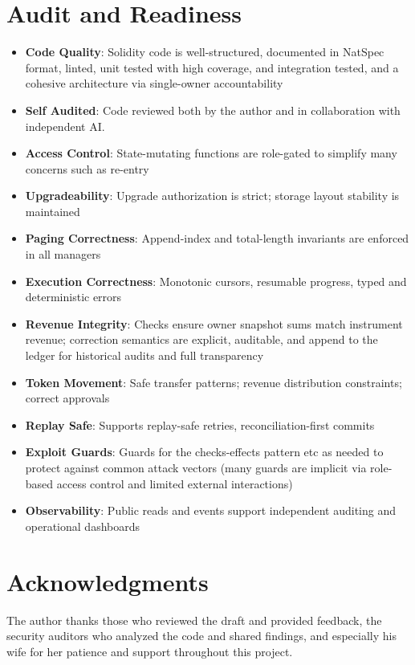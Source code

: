 \documentclass[10pt]{article}
\begin{document}
\section{Audit and Readiness}
\begin{itemize}
    \item \textbf{Code Quality}: Solidity code is well-structured, documented in NatSpec format, linted, unit tested with high coverage, and integration tested, and a cohesive architecture via single-owner accountability
    \item \textbf{Self Audited}: Code reviewed both by the author and in collaboration with independent AI.
    \item \textbf{Access Control}: State-mutating functions are role-gated to simplify many concerns such as re-entry
    \item \textbf{Upgradeability}: Upgrade authorization is strict; storage layout stability is maintained
    \item \textbf{Paging Correctness}: Append-index and total-length invariants are enforced in all managers
    \item \textbf{Execution Correctness}: Monotonic cursors, resumable progress, typed and deterministic errors
    \item \textbf{Revenue Integrity}: Checks ensure owner snapshot sums match instrument revenue; correction semantics are explicit, auditable, and append to the ledger for historical audits and full transparency
    \item \textbf{Token Movement}: Safe transfer patterns; revenue distribution constraints; correct approvals
    \item \textbf{Replay Safe}: Supports replay-safe retries, reconciliation-first commits
    \item \textbf{Exploit Guards}: Guards for the checks-effects pattern etc as needed to protect against
          common attack vectors (many guards are implicit via role-based access control and limited external interactions)
    \item \textbf{Observability}: Public reads and events support independent auditing and operational dashboards
\end{itemize}

\section{Acknowledgments}
The author thanks those who reviewed the draft and provided feedback, the security auditors who analyzed the code and shared findings, and especially his wife for her patience and support throughout this project.
\end{document}
